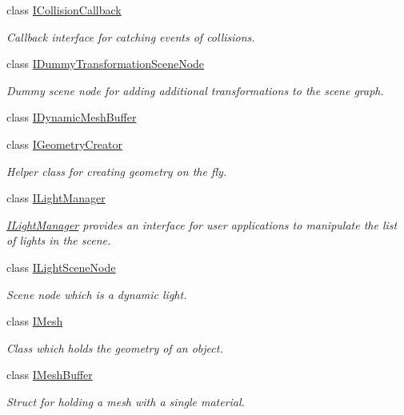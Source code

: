 \begin{DoxyCompactItemize}
class \hyperlink{classirr_1_1scene_1_1ICollisionCallback}{I\+Collision\+Callback}
\begin{DoxyCompactList}\small\item\em Callback interface for catching events of collisions. \end{DoxyCompactList}\item 
class \hyperlink{classirr_1_1scene_1_1IDummyTransformationSceneNode}{I\+Dummy\+Transformation\+Scene\+Node}
\begin{DoxyCompactList}\small\item\em Dummy scene node for adding additional transformations to the scene graph. \end{DoxyCompactList}\item 
class \hyperlink{classirr_1_1scene_1_1IDynamicMeshBuffer}{I\+Dynamic\+Mesh\+Buffer}
\item 
class \hyperlink{classirr_1_1scene_1_1IGeometryCreator}{I\+Geometry\+Creator}
\begin{DoxyCompactList}\small\item\em Helper class for creating geometry on the fly. \end{DoxyCompactList}\item 
class \hyperlink{classirr_1_1scene_1_1ILightManager}{I\+Light\+Manager}
\begin{DoxyCompactList}\small\item\em \hyperlink{classirr_1_1scene_1_1ILightManager}{I\+Light\+Manager} provides an interface for user applications to manipulate the list of lights in the scene. \end{DoxyCompactList}\item 
class \hyperlink{classirr_1_1scene_1_1ILightSceneNode}{I\+Light\+Scene\+Node}
\begin{DoxyCompactList}\small\item\em Scene node which is a dynamic light. \end{DoxyCompactList}\item 
class \hyperlink{classirr_1_1scene_1_1IMesh}{I\+Mesh}
\begin{DoxyCompactList}\small\item\em Class which holds the geometry of an object. \end{DoxyCompactList}\item 
class \hyperlink{classirr_1_1scene_1_1IMeshBuffer}{I\+Mesh\+Buffer}
\begin{DoxyCompactList}\small\item\em Struct for holding a mesh with a single material. \end{DoxyCompactList}\item 

\end{DoxyCompactItemize}
